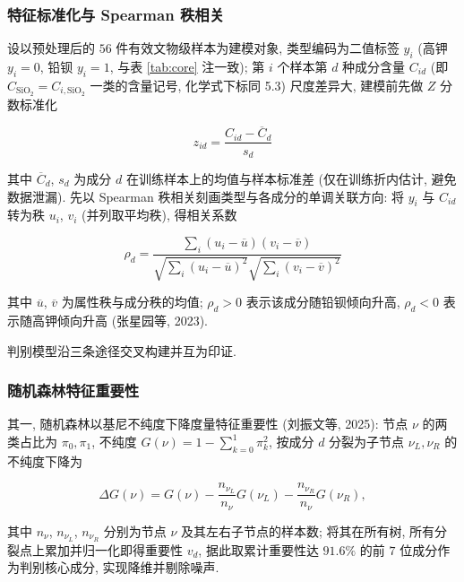 \documentclass{ctexart}
\begin{document}
\subsubsection{特征标准化与 Spearman 秩相关}

设以预处理后的 $56$ 件有效文物级样本为建模对象, 类型编码为二值标签 $y_i$ (高钾 $y_i=0$, 铅钡 $y_i=1$, 与表 \ref{tab:core} 注一致); 第 $i$ 个样本第 $d$ 种成分含量 $C_{id}$ (即 $C_{\mathrm{SiO_2}}=C_{i,\mathrm{SiO_2}}$ 一类的含量记号, 化学式下标同 5.3) 尺度差异大, 建模前先做 $Z$ 分数标准化

\begin{equation*}
z_{id}=\frac{C_{id}-\overline{C}_{d}}{s_{d}}
\end{equation*}

其中 $\overline{C}_d$, $s_d$ 为成分 $d$ 在训练样本上的均值与样本标准差 (仅在训练折内估计, 避免数据泄漏). 先以 Spearman 秩相关刻画类型与各成分的单调关联方向: 将 $y_i$ 与 $C_{id}$ 转为秩 $u_i$, $v_i$ (并列取平均秩), 得相关系数

\begin{equation*}
\rho_{d}=\frac{\sum_{i}\left(u_{i}-\overline{u}\right)\left(v_{i}-\overline{v}\right)}{\sqrt{\sum_{i}\left(u_{i}-\overline{u}\right)^{2}}\sqrt{\sum_{i}\left(v_{i}-\overline{v}\right)^{2}}}
\end{equation*}

其中 $\overline{u}$, $\overline{v}$ 为属性秩与成分秩的均值; $\rho_{d}>0$ 表示该成分随铅钡倾向升高, $\rho_{d}<0$ 表示随高钾倾向升高 (张星园等, 2023).

判别模型沿三条途径交叉构建并互为印证.

\subsubsection{随机森林特征重要性}

其一, 随机森林以基尼不纯度下降度量特征重要性 (刘振文等, 2025): 节点 $\nu$ 的两类占比为 $\pi_0,\pi_1$, 不纯度 $G\left(\nu\right)=1-\sum_{k=0}^{1}\pi_k^2$, 按成分 $d$ 分裂为子节点 $\nu_L,\nu_R$ 的不纯度下降为

\begin{equation*}
\Delta{}G\left(\nu\right)=G\left(\nu\right)-\frac{n_{\nu_L}}{n_\nu}G\left(\nu_L\right)-\frac{n_{\nu_R}}{n_\nu}G\left(\nu_R\right),
\end{equation*}

其中 $n_\nu$, $n_{\nu_L}$, $n_{\nu_R}$ 分别为节点 $\nu$ 及其左右子节点的样本数; 将其在所有树, 所有分裂点上累加并归一化即得重要性 $v_d$, 据此取累计重要性达 $91.6\%$ 的前 $7$ 位成分作为判别核心成分, 实现降维并剔除噪声.
\end{document}
